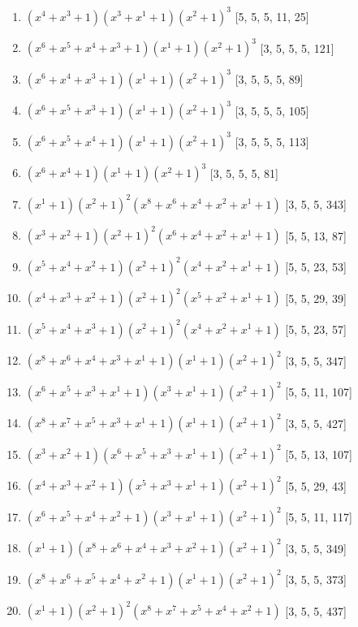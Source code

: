 \documentclass[10pt,twocolumn]{article}
\begin{document}
\begin{enumerate}
\item $(x^{4} + x^{3} + 1)(x^{3} + x^{1} + 1)(x^{2} + 1)^{3}$  [5, 5, 5, 11, 25]
\item $(x^{6} + x^{5} + x^{4} + x^{3} + 1)(x^{1} + 1)(x^{2} + 1)^{3}$  [3, 5, 5, 5, 121]
\item $(x^{6} + x^{4} + x^{3} + 1)(x^{1} + 1)(x^{2} + 1)^{3}$  [3, 5, 5, 5, 89]
\item $(x^{6} + x^{5} + x^{3} + 1)(x^{1} + 1)(x^{2} + 1)^{3}$  [3, 5, 5, 5, 105]
\item $(x^{6} + x^{5} + x^{4} + 1)(x^{1} + 1)(x^{2} + 1)^{3}$  [3, 5, 5, 5, 113]
\item $(x^{6} + x^{4} + 1)(x^{1} + 1)(x^{2} + 1)^{3}$  [3, 5, 5, 5, 81]
\item $(x^{1} + 1)(x^{2} + 1)^{2}(x^{8} + x^{6} + x^{4} + x^{2} + x^{1} + 1)$  [3, 5, 5, 343]
\item $(x^{3} + x^{2} + 1)(x^{2} + 1)^{2}(x^{6} + x^{4} + x^{2} + x^{1} + 1)$  [5, 5, 13, 87]
\item $(x^{5} + x^{4} + x^{2} + 1)(x^{2} + 1)^{2}(x^{4} + x^{2} + x^{1} + 1)$  [5, 5, 23, 53]
\item $(x^{4} + x^{3} + x^{2} + 1)(x^{2} + 1)^{2}(x^{5} + x^{2} + x^{1} + 1)$  [5, 5, 29, 39]
\item $(x^{5} + x^{4} + x^{3} + 1)(x^{2} + 1)^{2}(x^{4} + x^{2} + x^{1} + 1)$  [5, 5, 23, 57]
\item $(x^{8} + x^{6} + x^{4} + x^{3} + x^{1} + 1)(x^{1} + 1)(x^{2} + 1)^{2}$  [3, 5, 5, 347]
\item $(x^{6} + x^{5} + x^{3} + x^{1} + 1)(x^{3} + x^{1} + 1)(x^{2} + 1)^{2}$  [5, 5, 11, 107]
\item $(x^{8} + x^{7} + x^{5} + x^{3} + x^{1} + 1)(x^{1} + 1)(x^{2} + 1)^{2}$  [3, 5, 5, 427]
\item $(x^{3} + x^{2} + 1)(x^{6} + x^{5} + x^{3} + x^{1} + 1)(x^{2} + 1)^{2}$  [5, 5, 13, 107]
\item $(x^{4} + x^{3} + x^{2} + 1)(x^{5} + x^{3} + x^{1} + 1)(x^{2} + 1)^{2}$  [5, 5, 29, 43]
\item $(x^{6} + x^{5} + x^{4} + x^{2} + 1)(x^{3} + x^{1} + 1)(x^{2} + 1)^{2}$  [5, 5, 11, 117]
\item $(x^{1} + 1)(x^{8} + x^{6} + x^{4} + x^{3} + x^{2} + 1)(x^{2} + 1)^{2}$  [3, 5, 5, 349]
\item $(x^{8} + x^{6} + x^{5} + x^{4} + x^{2} + 1)(x^{1} + 1)(x^{2} + 1)^{2}$  [3, 5, 5, 373]
\item $(x^{1} + 1)(x^{2} + 1)^{2}(x^{8} + x^{7} + x^{5} + x^{4} + x^{2} + 1)$  [3, 5, 5, 437]

\end{enumerate}
\end{document}
